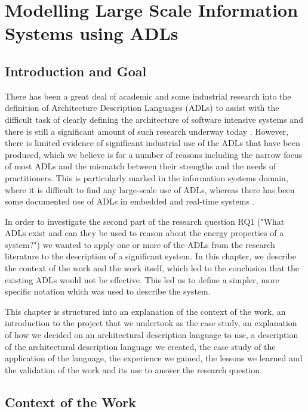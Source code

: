 \chapter{Modelling Large Scale Information Systems using ADLs}

\section{Introduction and Goal}

  There has been a great deal of academic and some industrial research into the definition of Architecture Description Languages (ADLs) to assist with the difficult task of clearly defining the architecture of software intensive systems and there is still a significant amount of such research underway today \cite{diruscio2010-byadl, cuenot2010-east, oquendo2004-piadl}.  However, there is limited evidence of significant industrial use of the ADLs that have been produced, which we believe is for a number of reasons \cite{bashroush2006-flexibleadls, woods2005-adlwg} including the narrow focus of most ADLs and the mismatch between their strengths and the needs of practitioners.  This is particularly marked in the information systems domain, where it is difficult to find any large-scale use of ADLs, whereas there has been some documented use of ADLs in embedded and real-time systems \cite{oquendo2004-piadl, vanommering2000-koala, allen2002-rtsystems}.

  In order to investigate the second part of the research question RQ1 ("What ADLs exist and can they be used to reason about the energy properties of a system?") we wanted to apply one or more of the ADLs from the research literature to the description of a significant system.  In this chapter, we describe the context of the work and the work itself, which led to the conclusion that the existing ADLs would not be effective.  This led us to define a simpler, more specific notation which was used to describe the system.

  This chapter is structured into an explanation of the context of the work, an introduction to the project that we undertook as the case study, an explanation of how we decided on an architectural description language to use, a description of the architectural description language we created, the case study of the application of the language, the experience we gained, the lessons we learned and the validation of the work and its use to answer the research question.

  \section{Context of the Work}

